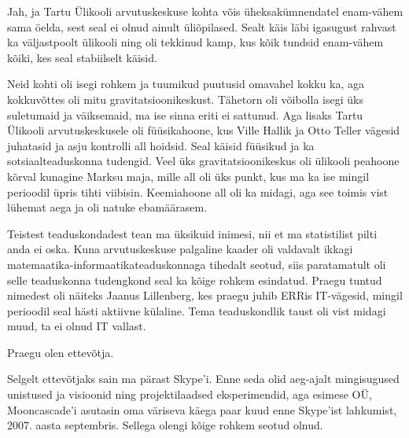 Jah, ja Tartu Ülikooli arvutuskeskuse kohta võis üheksakümnendatel 
enam-vähem sama öelda, sest seal ei olnud ainult üliõpilased. Sealt 
käis läbi igasugust rahvast ka väljastpoolt ülikooli ning oli tekkinud 
kamp, kus kõik tundsid enam-vähem kõiki, kes seal stabiilselt käisid. 


Neid kohti oli isegi rohkem ja tuumikud puutusid omavahel 
kokku ka, aga kokkuvõttes oli mitu gravitatsioonikeskust. Tähetorn oli 
võibolla isegi üks suletumaid ja väiksemaid, ma ise sinna
eriti ei sattunud. Aga lisaks Tartu Ülikooli 
arvutuskeskusele oli 
füüsikahoone, kus Ville 
Hallik ja Otto Teller 
vägesid juhatasid ja asju kontrolli all hoidsid. Seal käisid
füüsikud ja ka sotsiaalteaduskonna 
tudengid. Veel üks
gravitatsioonikeskus oli ülikooli peahoone kõrval kunagine Marksu 
maja, mille all oli üks punkt, kus ma ka
ise mingil perioodil üpris tihti viibisin. Keemiahoone all oli ka midagi, aga see toimis vist lühemat aega ja
oli natuke ebamäärasem. 


Teistest teaduskondadest tean ma üksikuid inimesi, nii et ma
statistilist pilti anda ei oska. Kuna arvutuskeskuse 
palgaline kaader oli valdavalt ikkagi 
matemaatika-informaatikateaduskonnaga tihedalt seotud, siis paratamatult oli 
selle teaduskonna tudengkond seal ka kõige rohkem esindatud. 
Praegu tuntud nimedest oli näiteks Jaanus Lillenberg, kes praegu juhib ERRis IT-vägesid, mingil perioodil seal hästi 
aktiivne külaline. Tema teaduskondlik taust oli vist
midagi muud, ta ei olnud IT vallast. 

Praegu olen ettevõtja. 


Selgelt ettevõtjaks sain ma pärast Skype'i. Enne 
seda olid aeg-ajalt mingisugused unistused ja visioonid ning
projektilaadsed eksperimendid, aga esimese OÜ, Mooncascade'i asutasin oma väriseva 
käega paar kuud enne Skype'ist lahkumist, 2007. aasta septembris. 
Sellega olengi kõige rohkem seotud olnud. 

